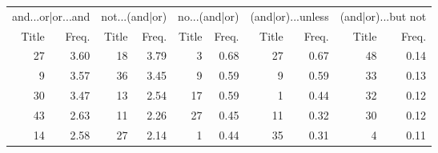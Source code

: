 \begin{tabular}{rrrrrrrrrr}
\multicolumn{2}{l}{and...or|or...and} & \multicolumn{2}{l}{not...(and|or)} & \multicolumn{2}{l}{no...(and|or)} & \multicolumn{2}{l}{(and|or)...unless} & \multicolumn{2}{l}{(and|or)...but not} \\
            Title & Freq. &          Title & Freq. &         Title & Freq. &             Title & Freq. &              Title & Freq. \\
\midrule
               27 &  3.60 &             18 &  3.79 &             3 &  0.68 &                27 &  0.67 &                 48 &  0.14 \\
                9 &  3.57 &             36 &  3.45 &             9 &  0.59 &                 9 &  0.59 &                 33 &  0.13 \\
               30 &  3.47 &             13 &  2.54 &            17 &  0.59 &                 1 &  0.44 &                 32 &  0.12 \\
               43 &  2.63 &             11 &  2.26 &            27 &  0.45 &                11 &  0.32 &                 30 &  0.12 \\
               14 &  2.58 &             27 &  2.14 &             1 &  0.44 &                35 &  0.31 &                  4 &  0.11 \\
\bottomrule
\end{tabular}



